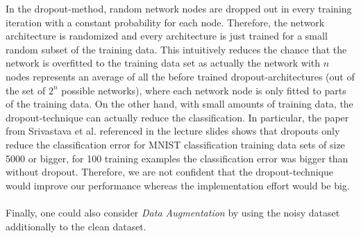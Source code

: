 \documentclass{article}
\begin{document}
In the dropout-method, random network nodes are dropped out in every training iteration with a constant probability for each node. Therefore, the network architecture is randomized and every architecture is just trained for a small random subset of the training data. This intuitively reduces the chance that the network is overfitted to the training data set as actually the network with $n$ nodes represents an average of all the before trained dropout-architectures (out of the set of $2^n$ possible networks), where each network node is only fitted to parts of the training data. On the other hand, with small amounts of training data, the dropout-technique can actually reduce the classification. In particular, the paper from Srivastava et al. referenced in the lecture slides shows that dropouts only reduce the classification error for MNIST classification training data sets of size 5000 or bigger, for 100 training examples the classification error was bigger than without dropout. Therefore, we are not confident that the dropout-technique would improve our performance whereas the implementation effort would be big.\\
\\
Finally, one could also consider \emph{Data Augmentation} by using the noisy dataset additionally to the clean dataset.
\end{document}
